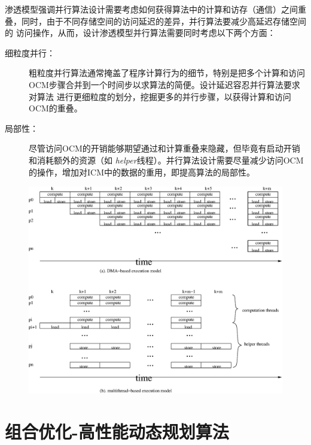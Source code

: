 \begin{flushleft}
渗透模型强调并行算法设计需要考虑如何获得算法中的计算和访存（通信）之间重叠，同时，由于不同存储空间的访问延迟的差异，并行算法要减少高延迟存储空间的
访问操作，从而，设计渗透模型并行算法需要同时考虑以下两个方面：
\begin{description}
	\item[细粒度并行：]粗粒度并行算法通常掩盖了程序计算行为的细节，特别是把多个计算和访问OCM步骤合并到一个时间步以求算法的简便。设计延迟容忍并行算法要求对算法
	进行更细粒度的划分，挖掘更多的并行步骤，以获得计算和访问OCM的重叠。
	\item[局部性：]尽管访问OCM的开销能够期望通过和计算重叠来隐藏，但毕竟有启动开销和消耗额外的资源（如{\it
		helper}线程）。并行算法设计需要尽量减少访问OCM的操作，增加对ICM中的数据的重用，即提高算法的局部性。
\end{description}
\begin{figure}[htbp]
	\centering
	\includegraphics[scale=0.8]{Img/Chap_Algorithm/tolerance_model}\\
	\label{fig:percolation_method}
	\vspace{-0.5cm}
\end{figure}


\section{组合优化-高性能动态规划算法}\label{sec:PM_dp}


\end{flushleft}
